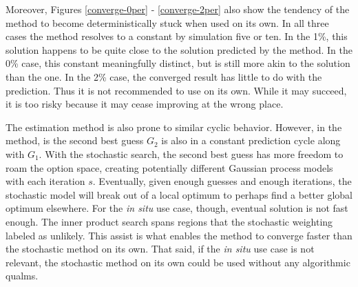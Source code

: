 Moreover,
Figures \ref{converge-0per} - \ref{converge-2per} also show the tendency of
the \innerprod method to become deterministically stuck when used on its own.
In all three cases the \innerprod method resolves to a constant by 
simulation five or ten.  In the 1\%, this solution happens to be quite close
to the solution predicted by the \allflag method.  In the 0\% case, this
constant meaningfully distinct, but is still more akin to the \stochastic 
solution than the \allflag one.  In the 2\% case, the converged \innerprod
result has little to do with the \allflag prediction.  Thus it is not
recommended to use \innerprod on its own. While it may succeed, it is too 
risky because it may cease improving at the wrong place.

The \stochastic estimation method is also prone to similar cyclic behavior.
However, in the \innerprod method, 
is the second best guess $G_2$ is also in a constant prediction cycle along 
with $G_1$.  With the stochastic search, the second best 
guess has more freedom to roam the option space, creating potentially 
different Gaussian process models with each iteration $s$.  Eventually, given 
enough guesses and enough iterations, the stochastic model will break 
out of a local optimum to perhaps find a better global optimum elsewhere.
For the \emph{in situ} use case, though, eventual solution is not fast
enough.  The inner product search spans regions that the stochastic weighting
labeled as unlikely.  This assist is what enables the \allflag method
to converge faster than the stochastic method on its own.  That said, 
if the \emph{in situ} use case is not relevant, the stochastic method on 
its own could be used without any algorithmic qualms.

